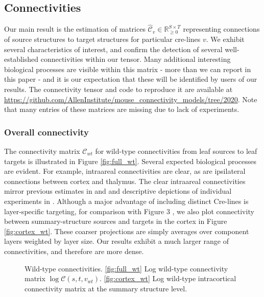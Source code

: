 
\newpage

\subsection{Connectivities}

Our main result is the estimation of matrices $\hat {\mathcal C}_v \in \mathbb R_{\geq 0}^{S \times T}$ representing connections of source structures to target structures for particular cre-lines $v$. 
We exhibit several characteristics of interest, and confirm the detection of several well-established connectivities within our tensor.
Many additional interesting biological processes are visible within this matrix - more than we can report in this paper - and it is our expectation that these will be identified by users of our results.
The connectivity tensor and code to reproduce it are available at \url{https://github.com/AllenInstitute/mouse_connectivity_models/tree/2020}.
Note that many entries of these matrices are missing due to lack of experiments.

\subsubsection{Overall connectivity}

The connectivity matrix $\mathcal C_{wt}$ for wild-type connectivities from leaf sources to leaf targets is illustrated in Figure \ref{fig:full_wt}.
Several expected biological processes are evident.
For example, intraareal connectivities are clear, as are ipsilateral connections between cortex and thalymus.
The clear intraareal connectivities mirror previous estimates in \citet{Oh2014-kh} and \citet{Knox2019-ot} and descriptive depictions of individual experiments in \citet{Harris2019-mr}.
Although a major advantage of including distinct Cre-lines is layer-specific targeting, for comparison with Figure 3 \citet{Knox2019-ot}, we also plot connectivity between summary-structure sources and targets in the cortex in Figure \ref{fig:cortex_wt}.
These coarser projections are simply averages over component layers weighted by layer size.
Our results exhibit a much larger range of connectivities, and therefore are more dense.

\newpage

\begin{figure}[H]
\centering
        \newline
   \caption{Wild-type connectivities.
   \ref{fig:full_wt} Log wild-type connectivity matrix $\log \mathcal {C} (s,t,v_{wt})$.
   \ref{fig:cortex_wt} Log wild-type intracortical connectivity matrix at the summary structure level.}
   \label{fig:connectome}
\end{figure}

